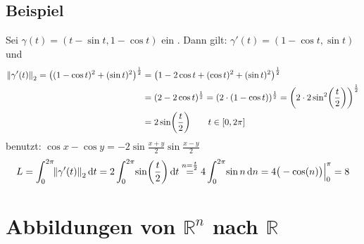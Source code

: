 \subsection[Beispiel: Länge eines Zykloids]{Beispiel} %
\label{sub:511}
Sei $\gamma(t)= (t- \sin t , 1-  \cos t  )$ ein . Dann gilt: $\gamma'(t) = (1- \cos t , \sin t )$ und 
\begin{align*}
	\norm[2]{\gamma'(t)}  = \enbrace*{ (1- \cos t)^2 + (\sin t)^2}^{\frac{1}{2} } &= \enbrace*{1- 2 \cos t + (\cos t)^2 + (\sin t)^2}^{\frac{1}{2}}  \\
	&= (2-2 \cos t)^{\frac{1}{2} } = ( 2 \cdot  (1- \cos t))^{\frac{1}{2}} = \enbrace*{2 \cdot 2 \sin^2 \enbrace*{\frac{t}{2}}}^{\frac{1}{2} } \\
	&= 2 \sin \enbrace*{\frac{t}{2}} \tag*{$t \in [0, 2\pi ]$}
\end{align*}
benutzt: $\cos x - \cos y = -2 \sin \frac{x+y}{2} \sin \frac{x-y}{2}  $
\begin{align*}
	L= \int_{0} ^{2 \pi } \! \norm[2]{\gamma'(t)}  \, \mathrm{d}t = 2 \int_{0} ^{2 \pi } \! \sin \enbrace*{\frac{t}{2}}   \, \mathrm{d}t \stackrel{n=\frac{t}{2} }{=} 
	4 \int_{0} ^{2 \pi } \! \sin n  \, \mathrm{d}n = 4 \big(- \cos (n) \big) \Big|_0^\pi  = 8      
\end{align*}
\newpage
\section{Abbildungen von $\mathds{R}^n$ nach $\mathds{R}$} %
\label{sec:6}
\begin{figure}[ht]
\end{figure}


